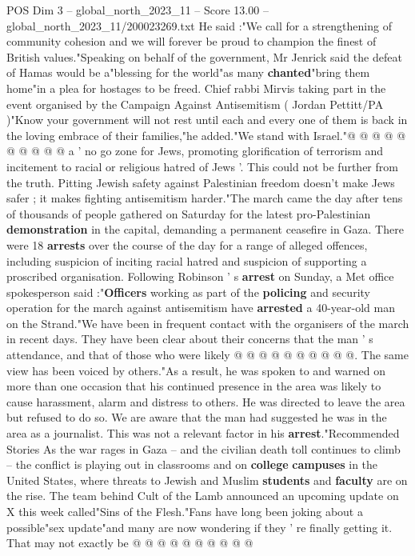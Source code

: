 \begin{textsample}{POS Dim 3 – global\_north\_2023\_11 – Score 13.00 – global\_north\_2023\_11/200023269.txt}
He said :"We call for a strengthening of community cohesion and we will forever be proud to champion the finest of British values."Speaking on behalf of the government, Mr Jenrick said the defeat of Hamas would be a"blessing for the world"as many \textbf{chanted}"bring them home"in a plea for hostages to be freed.
Chief rabbi Mirvis taking part in the event organised by the Campaign Against Antisemitism ( Jordan Pettitt/PA )"Know your government will not rest until each and every one of them is back in the loving embrace of their families,"he added."We stand with Israel."@ @ @ @ @ @ @ @ @ @ a ' no go zone for Jews, promoting glorification of terrorism and incitement to racial or religious hatred of Jews '.
This could not be further from the truth.
Pitting Jewish safety against Palestinian freedom doesn't make Jews safer ; it makes fighting antisemitism harder."The march came the day after tens of thousands of people gathered on Saturday for the latest pro-Palestinian \textbf{demonstration} in the capital, demanding a permanent ceasefire in Gaza.
There were 18 \textbf{arrests} over the course of the day for a range of alleged offences, including suspicion of inciting racial hatred and suspicion of supporting a proscribed organisation.
Following Robinson ' s \textbf{arrest} on Sunday, a Met office spokesperson said :"\textbf{Officers} working as part of the \textbf{policing} and security operation for the march against antisemitism have \textbf{arrested} a 40-year-old man on the Strand."We have been in frequent contact with the organisers of the march in recent days.
They have been clear about their concerns that the man ' s attendance, and that of those who were likely @ @ @ @ @ @ @ @ @ @.
The same view has been voiced by others."As a result, he was spoken to and warned on more than one occasion that his continued presence in the area was likely to cause harassment, alarm and distress to others.
He was directed to leave the area but refused to do so.
We are aware that the man had suggested he was in the area as a journalist.
This was not a relevant factor in his \textbf{arrest}."Recommended Stories As the war rages in Gaza -- and the civilian death toll continues to climb -- the conflict is playing out in classrooms and on \textbf{college} \textbf{campuses} in the United States, where threats to Jewish and Muslim \textbf{students} and \textbf{faculty} are on the rise.
The team behind Cult of the Lamb announced an upcoming update on X this week called"Sins of the Flesh."Fans have long been joking about a possible"sex update"and many are now wondering if they ' re finally getting it.
That may not exactly be @ @ @ @ @ @ @ @ @ @

\end{textsample}
